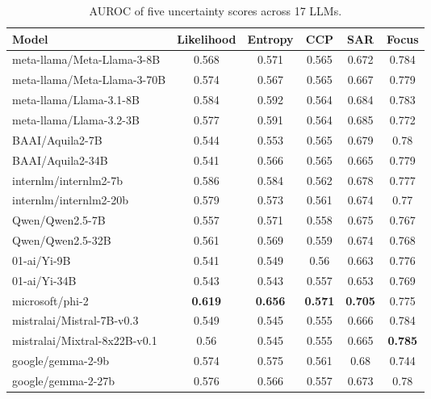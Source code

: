 \begin{table*}[t]
    \centering
    \small 
    \begin{tabular}{lccccc}
        \toprule
        Model & Likelihood & Entropy & CCP & SAR & Focus \\
\midrule
meta-llama/Meta-Llama-3-8B & 0.568 & 0.571 & 0.565 & 0.672 & 0.784 \\
meta-llama/Meta-Llama-3-70B & 0.574 & 0.567 & 0.565 & 0.667 & 0.779 \\
meta-llama/Llama-3.1-8B & 0.584 & 0.592 & 0.564 & 0.684 & 0.783 \\
meta-llama/Llama-3.2-3B & 0.577 & 0.591 & 0.564 & 0.685 & 0.772 \\
BAAI/Aquila2-7B & 0.544 & 0.553 & 0.565 & 0.679 & 0.78 \\
BAAI/Aquila2-34B & 0.541 & 0.566 & 0.565 & 0.665 & 0.779 \\
internlm/internlm2-7b & 0.586 & 0.584 & 0.562 & 0.678 & 0.777 \\
internlm/internlm2-20b & 0.579 & 0.573 & 0.561 & 0.674 & 0.77 \\
Qwen/Qwen2.5-7B & 0.557 & 0.571 & 0.558 & 0.675 & 0.767 \\
Qwen/Qwen2.5-32B & 0.561 & 0.569 & 0.559 & 0.674 & 0.768 \\
01-ai/Yi-9B & 0.541 & 0.549 & 0.56 & 0.663 & 0.776 \\
01-ai/Yi-34B & 0.543 & 0.543 & 0.557 & 0.653 & 0.769 \\
microsoft/phi-2 & \textbf{0.619} & \textbf{0.656} & \textbf{0.571} & \textbf{0.705} & 0.775 \\
mistralai/Mistral-7B-v0.3 & 0.549 & 0.545 & 0.555 & 0.666 & 0.784 \\
mistralai/Mixtral-8x22B-v0.1 & 0.56 & 0.545 & 0.555 & 0.665 & \textbf{0.785} \\
google/gemma-2-9b & 0.574 & 0.575 & 0.561 & 0.68 & 0.744 \\
google/gemma-2-27b & 0.576 & 0.566 & 0.557 & 0.673 & 0.78 \\
        \bottomrule
    \end{tabular}
    \caption{
     AUROC of five uncertainty scores across 17 LLMs.
    }
    \label{tb:auroc_17models}
\end{table*}